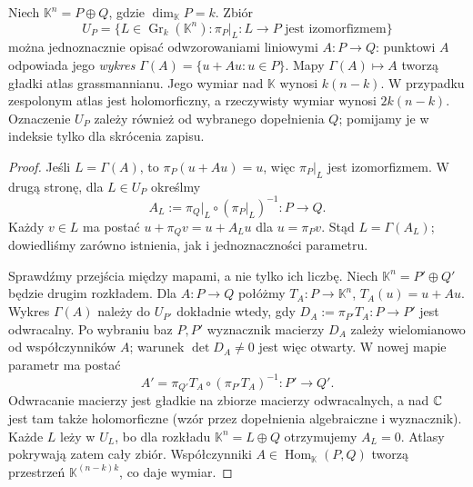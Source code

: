 \begin{twierdzenie}
\label{thm:grass-atlas}
Niech $\mathbb K^n=P\oplus Q$, gdzie $\dim_{\mathbb K}P=k$.
Zbiór
\[
 U_P=\{L\in\operatorname{Gr}_k(\mathbb K^n):
           \pi_P|_L:L\longrightarrow P\text{ jest izomorfizmem}\}
\]
można jednoznacznie opisać odwzorowaniami liniowymi
$A:P\to Q$: punktowi $A$ odpowiada jego
\emph{wykres} $\Gamma(A)=\{u+Au:u\in P\}$.
Mapy $\Gamma(A)\mapsto A$ tworzą gładki atlas
grassmannianu. Jego wymiar nad $\mathbb K$ wynosi
$k(n-k)$. W przypadku zespolonym atlas jest holomorficzny,
a rzeczywisty wymiar wynosi $2k(n-k)$.
Oznaczenie $U_P$ zależy również od wybranego dopełnienia $Q$;
pomijamy je w indeksie tylko dla skrócenia zapisu.
\end{twierdzenie}
\begin{proof}
Jeśli $L=\Gamma(A)$, to $\pi_P(u+Au)=u$, więc
$\pi_P|_L$ jest izomorfizmem. W drugą stronę, dla
$L\in U_P$ określmy
\[
 A_L:=\pi_Q|_L\circ(\pi_P|_L)^{-1}:P\longrightarrow Q.
\]
Każdy $v\in L$ ma postać $u+\pi_Qv=u+A_Lu$
dla $u=\pi_Pv$. Stąd $L=\Gamma(A_L)$; dowiedliśmy
zarówno istnienia, jak i jednoznaczności parametru.

Sprawdźmy przejścia między mapami, a nie tylko ich
liczbę. Niech $\mathbb K^n=P'\oplus Q'$ będzie drugim
rozkładem. Dla $A:P\to Q$ połóżmy
$T_A:P\to\mathbb K^n$, $T_A(u)=u+Au$.
Wykres $\Gamma(A)$ należy do $U_{P'}$ dokładnie wtedy,
gdy $D_A:=\pi_{P'}T_A:P\to P'$ jest odwracalny.
Po wybraniu baz $P,P'$ wyznacznik macierzy $D_A$ zależy
wielomianowo od współczynników $A$;
warunek $\det D_A\ne0$ jest więc otwarty. W nowej mapie
parametr ma postać
\begin{equation}\label{eq:grass-przejscie}
 A'=\pi_{Q'}T_A\circ(\pi_{P'}T_A)^{-1}:P'\longrightarrow Q'.
\end{equation}
Odwracanie macierzy jest gładkie na zbiorze macierzy
odwracalnych, a nad $\mathbb{C}$ jest tam także holomorficzne
(wzór przez dopełnienia algebraiczne i wyznacznik).
Każde $L$ leży w $U_L$, bo dla rozkładu
$\mathbb K^n=L\oplus Q$ otrzymujemy $A_L=0$.
Atlasy pokrywają zatem cały zbiór. Współczynniki
$A\in\operatorname{Hom}_{\mathbb K}(P,Q)$ tworzą
przestrzeń $\mathbb K^{(n-k)k}$, co daje wymiar.


\end{proof}
